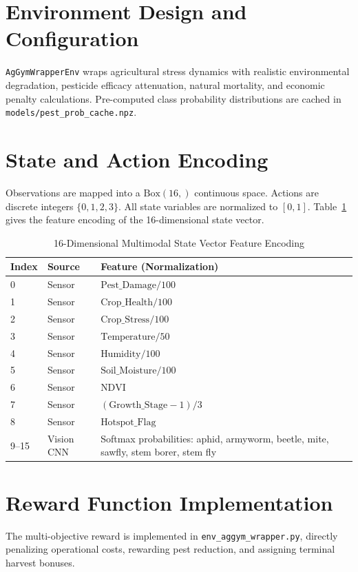 \documentclass[12pt,a4paper]{report}
\begin{document}
\section{Environment Design and Configuration}
\texttt{AgGymWrapperEnv} wraps agricultural stress dynamics with realistic environmental degradation, pesticide efficacy attenuation, natural mortality, and economic penalty calculations. Pre-computed class probability distributions are cached in \texttt{models/pest\_prob\_cache.npz}.

\section{State and Action Encoding}
Observations are mapped into a $\text{Box}(16,)$ continuous space. Actions are discrete integers $\{0, 1, 2, 3\}$. All state variables are normalized to $[0, 1]$. Table~\ref{tab:state_enc} gives the feature encoding of the 16-dimensional state vector.

\begin{table}[H]
\centering
\caption{16-Dimensional Multimodal State Vector Feature Encoding}
\label{tab:state_enc}
\begin{tabular}{lll}
\toprule
\textbf{Index} & \textbf{Source} & \textbf{Feature (Normalization)} \\
\midrule
0 & Sensor & $\text{Pest\_Damage} / 100$ \\
1 & Sensor & $\text{Crop\_Health} / 100$ \\
2 & Sensor & $\text{Crop\_Stress} / 100$ \\
3 & Sensor & $\text{Temperature} / 50$ \\
4 & Sensor & $\text{Humidity} / 100$ \\
5 & Sensor & $\text{Soil\_Moisture} / 100$ \\
6 & Sensor & $\text{NDVI}$ \\
7 & Sensor & $(\text{Growth\_Stage} - 1) / 3$ \\
8 & Sensor & $\text{Hotspot\_Flag}$ \\
9--15 & Vision CNN & Softmax probabilities: aphid, armyworm, beetle, mite, sawfly, stem borer, stem fly \\
\bottomrule
\end{tabular}
\end{table}

\section{Reward Function Implementation}
The multi-objective reward is implemented in \texttt{env\_aggym\_wrapper.py}, directly penalizing operational costs, rewarding pest reduction, and assigning terminal harvest bonuses.
\end{document}
